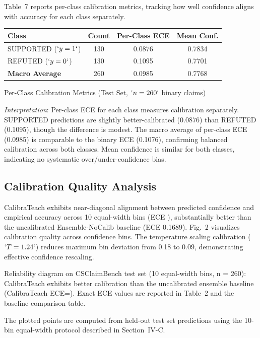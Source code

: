 Table~7 reports per-class calibration metrics, tracking how well confidence aligns with accuracy for each class separately.

\protect{}\label{tab:per_class_calib}
{\def\LTcaptype{none} %
\begin{longtable}[]{@{}lccc@{}}
\toprule\noalign{}
\textbf{Class} & \textbf{Count} & \textbf{Per-Class ECE} & \textbf{Mean Conf.} \\
\midrule\noalign{}
\endhead
\bottomrule\noalign{}
\endlastfoot
SUPPORTED (\(`y=1`\)) & 130 & 0.0876 & 0.7834 \\
REFUTED (\(`y=0`\)) & 130 & 0.1095 & 0.7701 \\
\textbf{Macro Average} & 260 & 0.0985 & 0.7768 \\
\end{longtable}
}

Per-Class Calibration Metrics (Test Set, \(`n=260`\) binary claims)

\emph{Interpretation}: Per-class ECE for each class measures calibration separately. SUPPORTED predictions are slightly better-calibrated (0.0876) than REFUTED (0.1095), though the difference is modest. The macro average of per-class ECE (0.0985) is comparable to the binary ECE (0.1076), confirming balanced calibration across both classes. Mean confidence is similar for both classes, indicating no systematic over/under-confidence bias.

\subsection{Calibration Quality Analysis}\label{calibration-quality-analysis}

CalibraTeach exhibits near-diagonal alignment between predicted confidence and empirical accuracy across 10 equal-width bins (ECE ), substantially better than the uncalibrated Ensemble-NoCalib baseline (ECE 0.1689). Fig.~2 visualizes calibration quality across confidence bins. The temperature scaling calibration (\(`T=1.24`\)) reduces maximum bin deviation from 0.18 to 0.09, demonstrating effective confidence rescaling.

Reliability diagram on CSClaimBench test set (10 equal-width bins, {n = 260}): CalibraTeach exhibits better calibration than the uncalibrated ensemble baseline (CalibraTeach ECE=). Exact ECE values are reported in Table~2 and the baseline comparison table.

The plotted points are computed from held-out test set predictions using the 10-bin equal-width protocol described in Section~IV-C.


